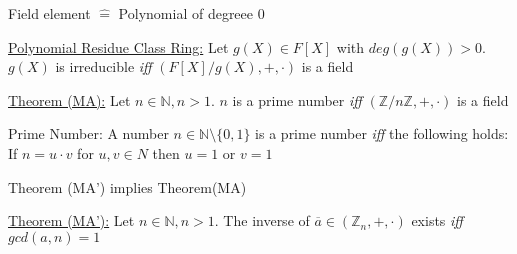 \documentclass[landscape, a4paper]{article}
\begin{document}
\begin{minipage}[t]{0.198\pagewidth}
\begin{betterlist}
\begin{betterlist}
\begin{betterlist}
\begin{betterlist}
\begin{betterlist}
						\item Field element $\hat =$ Polynomial of degreee $0$
					\end{betterlist}
				\end{betterlist}
			\end{betterlist}
			\item \underline{Polynomial Residue Class Ring:} Let $g(X)\in F[X]$ with $deg(g(X)) > 0$. $g(X)$ is \alert{irreducible} \textit{iff} $(F[X]/g(X), +, \cdot)$ is a field
		\end{betterlist}
	\end{betterlist}
	\begin{betterlist}
		\item \underline{Theorem (MA):} Let $n \in \mathbb{N}, n > 1$. $n$ is a prime number \textit{iff} $(\mathbb{Z}/n\mathbb{Z}, +, \cdot)$ is a field
		\begin{betterlist}
			\item \alert{Prime Number}: A number $n \in \mathbb{N} \setminus \{0, 1\}$ is a prime number \textit{iff} the following holds: If $n = u \cdot v$ for $u, v \in N$ then $u = 1$ or $v = 1$
			\begin{betterlist}
				\item Theorem (MA') implies Theorem(MA)
			\end{betterlist}
		\end{betterlist}
		\item \underline{Theorem (MA’):} Let $n \in \mathbb{N}, n > 1$. The inverse of $\overline{a} \in (\mathbb{Z}_n, +, \cdot)$ exists \textit{iff} $gcd(a, n) = 1$
		\begin{betterlist}

\end{betterlist}
\end{betterlist}
\end{minipage}
\end{document}
